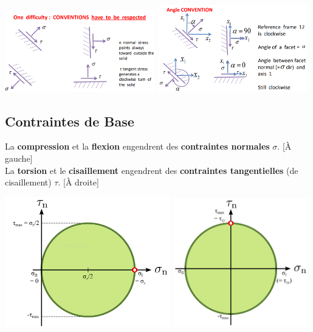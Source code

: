 \documentclass[a4paper]{article}
\begin{document}
\begin{center}
\includegraphics[width=0.49\textwidth]{images/StressConvention.PNG}
\includegraphics[width=0.49\textwidth]{images/AngleConvention.PNG}
\end{center}





\subsection{Contraintes de Base}





La \textbf{compression} et la \textbf{flexion} engendrent des \textbf{contraintes normales} $ \sigma $. [À gauche] \\
La \textbf{torsion} et le \textbf{cisaillement} engendrent des \textbf{contraintes tangentielles} (de cisaillement) $ \tau $. [À droite]

\begin{center}
\includegraphics[width=0.54\textwidth]{images/sigmaPurMohr.PNG}
\includegraphics[width=0.44\textwidth]{images/tauPurMohr.PNG}
\end{center}
\end{document}
